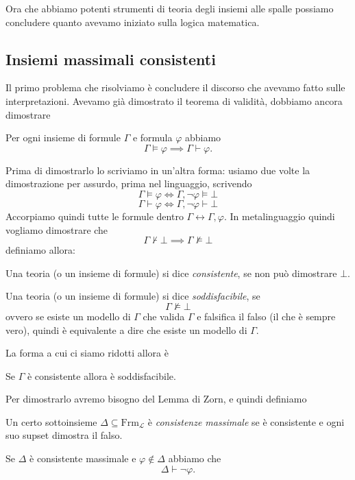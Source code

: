 \documentclass[11pt]{scrartcl}
\begin{document}
 	Ora che abbiamo potenti strumenti di teoria degli insiemi alle spalle possiamo concludere quanto avevamo iniziato sulla logica matematica.
 	\subsection{Insiemi massimali consistenti}
 	
 	Il primo problema che risolviamo è concludere il discorso che avevamo fatto sulle interpretazioni. Avevamo già dimostrato il teorema di validità, dobbiamo ancora dimostrare
 	\begin{metateorema}[Completezza]
 		Per ogni insieme di formule $\Gamma$ e formula $\varphi$ abbiamo
 		$$\Gamma \models \varphi \implies \Gamma \vdash \varphi.$$
 	\end{metateorema}
 	Prima di dimostrarlo lo scriviamo in un'altra forma:
 	usiamo due volte la dimostrazione per assurdo, prima nel linguaggio, scrivendo
 	$$\Gamma \models \varphi \iff \Gamma,\lnot\varphi \models \bot$$
 	$$\Gamma \vdash \varphi \iff \Gamma,\lnot\varphi \vdash \bot$$
 	Accorpiamo quindi tutte le formule dentro $\Gamma\leftrightarrow \Gamma,\varphi$.
 	In metalinguaggio quindi vogliamo dimostrare che
 	$$\Gamma \not\vdash \bot \implies \Gamma \not\models \bot$$
 	definiamo allora:
 	\begin{definition}[Consistenza]
 		Una teoria (o un insieme di formule) si dice \textit{consistente}, se non può dimostrare $\bot$.
 	\end{definition}
 	\begin{definition}[Soddisfacibilità]
 		Una teoria (o un insieme di formule) si dice \textit{soddisfacibile}, se 
 		$$\Gamma\not\models \bot$$
 		ovvero se esiste un modello di $\Gamma$ che valida $\Gamma$ e falsifica il falso (il che è sempre vero), quindi è equivalente a dire che esiste un modello di $\Gamma$.
 	\end{definition}
 	La forma a cui ci siamo ridotti allora è
 	\begin{metateorema}
 		Se $\Gamma$ è consistente allora è soddisfacibile.
 	\end{metateorema}
 	Per dimostrarlo avremo bisogno del Lemma di Zorn, e quindi definiamo
 	\begin{definition}
 		Un certo sottoinsieme $\Delta\subseteq \text{Frm}_{\mathcal{L}}$ è \textit{consistenze massimale} se è consistente e ogni suo supset dimostra il falso.
 	\end{definition}
 	\begin{lemma}
 		Se $\Delta$ è consistente massimale e $\varphi\not\in \Delta$ abbiamo che 
 		$$\Delta \vdash \lnot \varphi.$$ 
 	\end{lemma}
\end{document}
